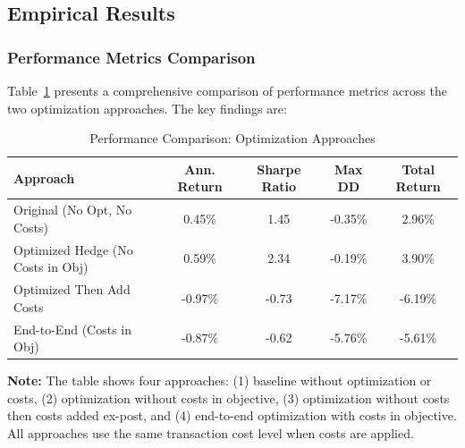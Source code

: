 
\subsection{Empirical Results}

\subsubsection{Performance Metrics Comparison}

Table~\ref{tab:optimization_comparison} presents a comprehensive comparison of performance metrics across the two optimization approaches. The key findings are:

\begin{table}[h]
\centering
\caption{Performance Comparison: Optimization Approaches}
\label{tab:optimization_comparison}
\begin{tabular}{lcccc}
\toprule
\textbf{Approach} & \textbf{Ann. Return} & \textbf{Sharpe Ratio} & \textbf{Max DD} & \textbf{Total Return} \\
\midrule
Original (No Opt, No Costs) & 0.45\% & 1.45 & -0.35\% & 2.96\% \\
Optimized Hedge (No Costs in Obj) & 0.59\% & 2.34 & -0.19\% & 3.90\% \\
Optimized Then Add Costs & -0.97\% & -0.73 & -7.17\% & -6.19\% \\
End-to-End (Costs in Obj) & -0.87\% & -0.62 & -5.76\% & -5.61\% \\
\bottomrule
\end{tabular}
\end{table}

\textbf{Note:} The table shows four approaches: (1) baseline without optimization or costs, (2) optimization without costs in objective, (3) optimization without costs then costs added ex-post, and (4) end-to-end optimization with costs in objective. All approaches use the same transaction cost level when costs are applied.


